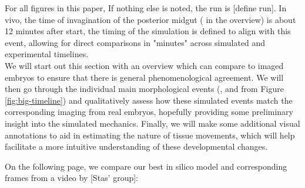 For all figures in this paper, If nothing else is noted, the run is [define run]. In vivo, the time of invagination of the posterior midgut ( in the overview) is about 12 minutes after start, the timing of the simulation is defined to align with this event, allowing for direct comparisons in "minutes" across simulated and experimental timelines.\\


We will start out this section with an overview which can compare to imaged embryos to ensure that there is general phenomenological agreement. We will then go through the individual main morphological events (,  and  from Figure \ref{fig:big-timeline}) and qualitatively assess how these simulated events match the corresponding imaging from real embryos, hopefully providing some preliminary insight into the simulated mechanics. Finally, we will make some additional visual annotations to aid in estimating the nature of tissue movements, which will help facilitate a more intuitive understanding of these developmental changes.

On the following page, we compare our best in silico model and corresponding frames from a video by [Stas' group]: 
\newpage


